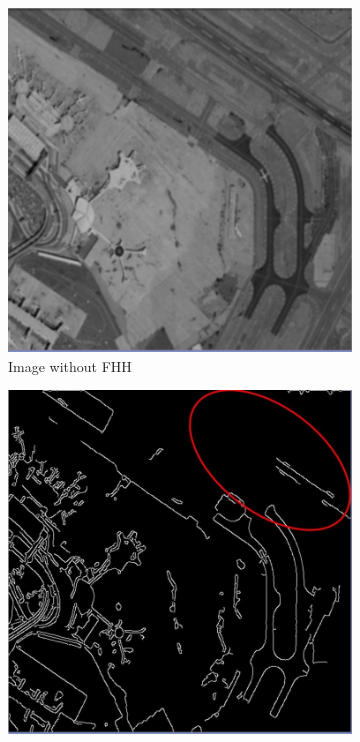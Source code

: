 \documentclass[conference]{IEEEtran}
\begin{document}
\begin{figure}
    \begin{subfigure}[b]{0.48\linewidth}
        \centerline{\includegraphics[width=\linewidth]{no_fuzzy_a.JPG}}
        \caption{Image without FHH \label{subfig:no_fhh_a}}
    \end{subfigure}
    \begin{subfigure}[b]{0.48\linewidth}
        \centerline{\includegraphics[width=\linewidth]{no_fuzzy_b.JPG}}

\end{subfigure}
\end{figure}
\end{document}
